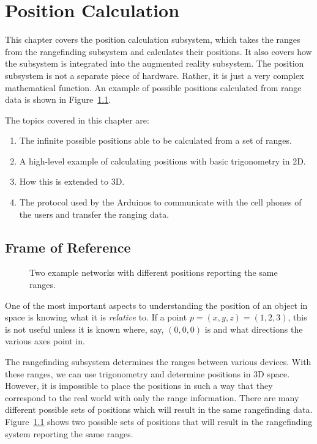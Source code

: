 

\chapter{Position Calculation} %

\label{PositionCalculation}


This chapter covers the position calculation subsystem, which takes the ranges from the rangefinding subsystem and calculates their positions. It also covers how the subsystem is integrated into the augmented reality subsystem. The position subsystem is not a separate piece of hardware. Rather, it is just a very complex mathematical function. An example of possible positions calculated from range data is shown in Figure~\ref{fig:FrameOfReference}.

The topics covered in this chapter are:
\begin{enumerate}
	\item The infinite possible positions able to be calculated from a set of ranges.
	\item A high-level example of calculating positions with basic trigonometry in 2D.
	\item How this is extended to 3D.
	\item The protocol used by the Arduinos to communicate with the cell phones of the users and transfer the ranging data.
\end{enumerate}

\section{Frame of Reference}
\label{FrameOfReference}
\begin{figure}
	\centering
	
	\decoRule
	\caption{Two example networks with different positions reporting the same ranges.}
	\label{fig:FrameOfReference}
\end{figure}

One of the most important aspects to understanding the position of an object in space is knowing what it is \emph{relative} to. If a point $p = (x, y, z) = (1, 2, 3)$, this is not useful unless it is known where, say, $(0, 0, 0)$ is and what directions the various axes point in.

The rangefinding subsystem determines the ranges between various devices. With these ranges, we can use trigonometry and determine positions in 3D space. However, it is impossible to place the positions in such a way that they correspond to the real world with only the range information. There are many different possible sets of positions which will result in the same rangefinding data. Figure~\ref{fig:FrameOfReference} shows two possible sets of positions that will result in the rangefinding system reporting the same ranges.

